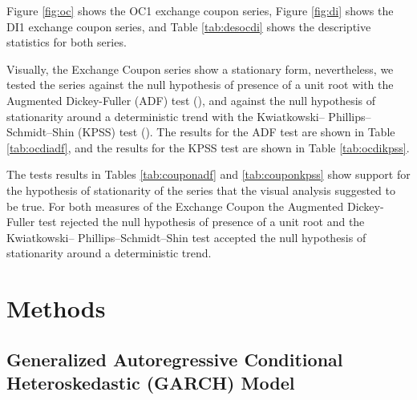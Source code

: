 \documentclass[cic,tc, english]{iiufrgs}
\begin{document}
    Figure \ref{fig:oc} shows the OC1 exchange coupon series, Figure \ref{fig:di} shows the DI1 exchange coupon series, and Table \ref{tab:desocdi} shows the descriptive statistics for both series.

    

    

    

    Visually, the Exchange Coupon series show a stationary form, nevertheless, we tested the series against the null hypothesis of presence of a unit root with the Augmented Dickey-Fuller (ADF) test (\citet{adf}), and against the null hypothesis of stationarity around a deterministic trend with the Kwiatkowski– Phillips–Schmidt–Shin (KPSS) test (\citet{kpss}). The results for the ADF test are shown in Table \ref{tab:ocdiadf}, and the results for the KPSS test are shown in Table \ref{tab:ocdikpss}.

    

    

    The tests results in Tables \ref{tab:couponadf} and \ref{tab:couponkpss} show support for the hypothesis of stationarity of the series that the visual analysis suggested to be true. For both measures of the Exchange Coupon the Augmented Dickey-Fuller test rejected the null hypothesis of presence of a unit root and the Kwiatkowski– Phillips–Schmidt–Shin test accepted the null hypothesis of stationarity around a deterministic trend.
    
    \begin{comment}
        On ten of October 2015 a impeachment request for president Dilma Rousseff was handed to the Chamber Of Representatives' president, who accepted the request on December second. The opening of the impeachment process was accepted by the special impeachment committee on eleven of April 2016.
    \end{comment}

\section{Methods} \label{chapter_methods}

\subsection{Generalized Autoregressive Conditional Heteroskedastic (GARCH) Model}
\end{document}
